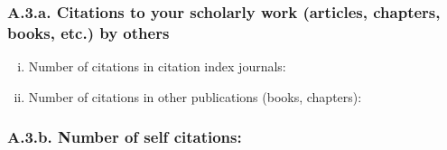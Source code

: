 
\subsubsection*{A.3.a. Citations to your scholarly work (articles, chapters, books, etc.) by others}

\begin{enumerate}[i)]

\item  Number of citations in citation index journals:	
\item Number of citations in other publications (books, chapters):	

\end{enumerate}

\subsubsection*{A.3.b. Number of self citations:}


